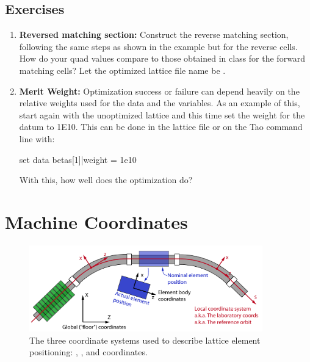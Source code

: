 \documentclass{hitec}     %
\begin{document}
{\subsection{Exercises}

\begin{enumerate}[leftmargin=*]
\item {\bf Reversed matching section:} Construct the reverse matching section, following the same steps as shown in the example but for the reverse cells. How do your quad values compare to those obtained in class for the forward matching cells? Let the optimized lattice file name be .
%
\item {\bf Merit Weight:} 
Optimization success or failure can depend heavily on the relative weights used for the data and the variables.
As an example of this, start again with the unoptimized lattice and this time set the weight for the datum 
 to 1E10. This can be done in the lattice file or on the Tao command line with:
\begin{code}
set data betas[1]|weight = 1e10
\end{code}
With this, how well does the optimization do?
\end{enumerate}

\newpage

\section{Machine Coordinates}
\label{s:coords}

\begin{figure}[tb]
  \centering
  \includegraphics[width=0.9\textwidth]{figures/coordinates.pdf}
  \caption{The three coordinate systems used to describe lattice element positioning:
, , and  coordinates.}
  \label{f:coordinates}
\end{figure}

}
\end{document}
